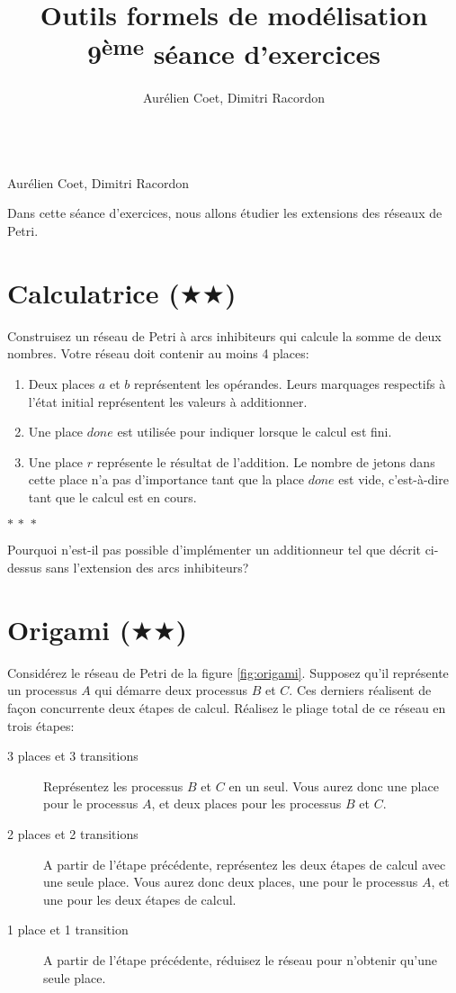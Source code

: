\documentclass[a4paper, titlepage]{article}
\makeatletter
\numberwithin{figure}{section}
\numberwithin{table}{section}
\newcommand\objective[1]{\def\@objective{#1}}
\newcommand{\makecustomtitle}{%
	\begin{center}
		\huge\@title \\
		[1ex]\small Aurélien Coet, Dimitri Racordon \\
	\end{center}
	\@objective
}
\makeatother
\begin{document}
\title{Outils formels de modélisation \\ 9\textsuperscript{ème} séance d'exercices}
\author{Aurélien Coet, Dimitri Racordon}
\objective{Dans cette séance d'exercices, nous allons étudier les extensions des réseaux de Petri.}

\makecustomtitle


\section{Calculatrice ($\bigstar\bigstar$)}

Construisez un réseau de Petri à arcs inhibiteurs qui calcule la somme de deux nombres.
Votre réseau doit contenir au moins 4 places:
\begin{enumerate}
  \item
    Deux places $a$ et $b$ représentent les opérandes.
    Leurs marquages respectifs à l'état initial représentent les valeurs à additionner.
  \item
    Une place $\mathit{done}$ est utilisée pour indiquer lorsque le calcul est fini.
  \item
    Une place $r$ représente le résultat de l'addition.
    Le nombre de jetons dans cette place n'a pas d'importance tant que la place $\mathit{done}$ est vide, c'est-à-dire tant que le calcul est en cours.
\end{enumerate}

\begin{center}
${\ast}\,{\ast}\,{\ast}$
\end{center}

Pourquoi n'est-il pas possible d'implémenter un additionneur tel que décrit ci-dessus sans l'extension des arcs inhibiteurs?


\section{Origami ($\bigstar\bigstar$)}

Considérez le réseau de Petri de la figure \ref{fig:origami}.
Supposez qu'il représente un processus $A$ qui démarre deux processus $B$ et $C$.
Ces derniers réalisent de façon concurrente deux étapes de calcul.
Réalisez le pliage total de ce réseau en trois étapes:
\begin{description}
  \item[3 places et 3 transitions]
    Représentez les processus $B$ et $C$ en un seul.
    Vous aurez donc une place pour le processus $A$, et deux places pour les processus $B$ et $C$.
  \item[2 places et 2 transitions]
  A partir de l'étape précédente, représentez les deux étapes de calcul avec une seule place.
  Vous aurez donc deux places, une pour le processus $A$, et une pour les deux étapes de calcul.
  \item[1 place et 1 transition]
    A partir de l'étape précédente, réduisez le réseau pour n'obtenir qu'une seule place.
\end{description}
\end{document}
